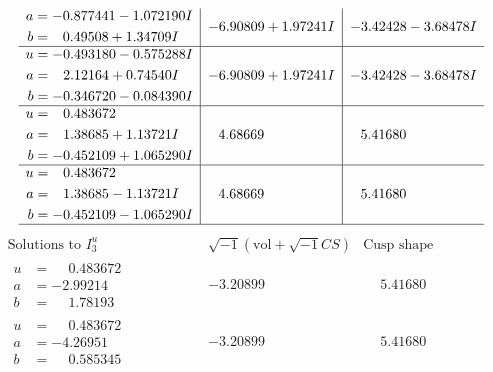 \documentclass[1p]{elsarticle_modified}
\theoremstyle{definition}
\newcommand{\I}{\sqrt{-1}}
\begin{document}
$$\begin{array}{c|c|c}
\begin{aligned}
a &= -0.877441 - 1.072190 I \\
b &= \phantom{-}0.49508 + 1.34709 I\end{aligned}
 & -6.90809 + 1.97241 I & -3.42428 - 3.68478 I \\ \hline\begin{aligned}
u &= -0.493180 - 0.575288 I \\
a &= \phantom{-}2.12164 + 0.74540 I \\
b &= -0.346720 - 0.084390 I\end{aligned}
 & -6.90809 + 1.97241 I & -3.42428 - 3.68478 I \\ \hline\begin{aligned}
u &= \phantom{-}0.483672\phantom{ +0.000000I} \\
a &= \phantom{-}1.38685 + 1.13721 I \\
b &= -0.452109 + 1.065290 I\end{aligned}
 & \phantom{-}4.68669\phantom{ +0.000000I} & \phantom{-}5.41680\phantom{ +0.000000I} \\ \hline\begin{aligned}
u &= \phantom{-}0.483672\phantom{ +0.000000I} \\
a &= \phantom{-}1.38685 - 1.13721 I \\
b &= -0.452109 - 1.065290 I\end{aligned}
 & \phantom{-}4.68669\phantom{ +0.000000I} & \phantom{-}5.41680\phantom{ +0.000000I}\\
 \hline 
 \end{array}$$\newpage$$\begin{array}{c|c|c}  
\text{Solutions to }I^u_{3}& \I (\text{vol} + \sqrt{-1}CS) & \text{Cusp shape}\\
 \hline 
\begin{aligned}
u &= \phantom{-}0.483672\phantom{ +0.000000I} \\
a &= -2.99214\phantom{ +0.000000I} \\
b &= \phantom{-}1.78193\phantom{ +0.000000I}\end{aligned}
 & -3.20899\phantom{ +0.000000I} & \phantom{-}5.41680\phantom{ +0.000000I} \\ \hline\begin{aligned}
u &= \phantom{-}0.483672\phantom{ +0.000000I} \\
a &= -4.26951\phantom{ +0.000000I} \\
b &= \phantom{-}0.585345\phantom{ +0.000000I}\end{aligned}
 & -3.20899\phantom{ +0.000000I} & \phantom{-}5.41680\phantom{ +0.000000I} \\ \hline\begin{aligned}

\end{aligned}
\end{array}$$
\end{document}
